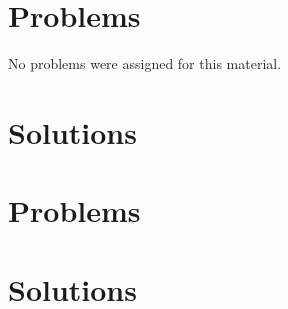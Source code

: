    \section{Problems}
      No problems were assigned for this material.
   \section{Solutions}
      \shipoutAnswer

   
   
   
   \section{Problems}
      
   \section{Solutions}
      \shipoutAnswer

%
